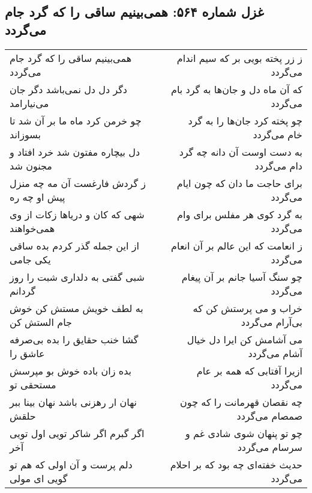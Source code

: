 \begin{center}
\section*{غزل شماره ۵۶۴: همی‌بینیم ساقی را که گرد جام می‌گردد}
\label{sec:0564}
\begin{longtable}{l p{0.5cm} r}
همی‌بینیم ساقی را که گرد جام می‌گردد
&&
ز زر پخته بویی بر که سیم اندام می‌گردد
\\
دگر دل دل نمی‌باشد دگر جان می‌نیارامد
&&
که آن ماه دل و جان‌ها به گرد بام می‌گردد
\\
چو خرمن کرد ماه ما بر آن شد تا بسوزاند
&&
چو پخته کرد جان‌ها را به گرد خام می‌گردد
\\
دل بیچاره مفتون شد خرد افتاد و مجنون شد
&&
به دست اوست آن دانه چه گرد دام می‌گردد
\\
ز گردش فارغست آن مه چه منزل پیش او چه ره
&&
برای حاجت ما دان که چون ایام می‌گردد
\\
شهی که کان و دریاها زکات از وی همی‌خواهند
&&
به گرد کوی هر مفلس برای وام می‌گردد
\\
از این جمله گذر کردم بده ساقی یکی جامی
&&
ز انعامت که این عالم بر آن انعام می‌گردد
\\
شبی گفتی به دلداری شبت را روز گردانم
&&
چو سنگ آسیا جانم بر آن پیغام می‌گردد
\\
به لطف خویش مستش کن خوش جام الستش کن
&&
خراب و می پرستش کن که بی‌آرام می‌گردد
\\
گشا خنب حقایق را بده بی‌صرفه عاشق را
&&
می آشامش کن ایرا دل خیال آشام می‌گردد
\\
بده زان باده خوش بو مپرسش مستحقی تو
&&
ازیرا آفتابی که همه بر عام می‌گردد
\\
نهان ار رهزنی باشد نهان بینا ببر حلقش
&&
چه نقصان قهرمانت را که چون صمصام می‌گردد
\\
اگر گبرم اگر شاکر تویی اول تویی آخر
&&
چو تو پنهان شوی شادی غم و سرسام می‌گردد
\\
دلم پرست و آن اولی که هم تو گویی ای مولی
&&
حدیث خفته‌ای چه بود که بر احلام می‌گردد
\\
\end{longtable}
\end{center}
